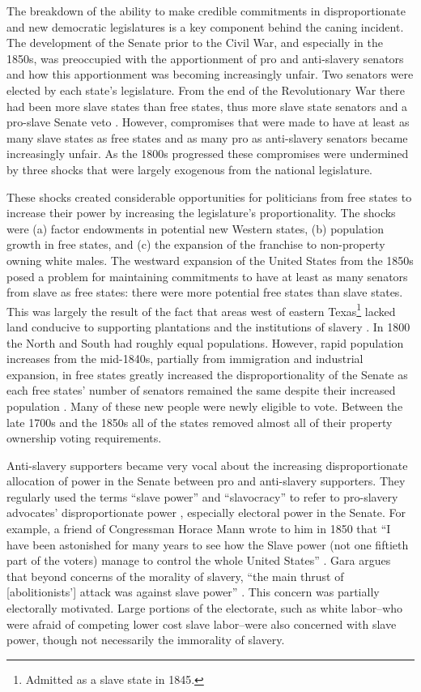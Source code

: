 \documentclass[a4paper]{article}\usepackage[]{graphicx}\usepackage[]{color}
\begin{document}
The breakdown of the ability to make credible commitments in disproportionate and new democratic legislatures is a key component behind the caning incident. The development of the Senate prior to the Civil War, and especially in the 1850s, was preoccupied with the apportionment of pro and anti-slavery senators and how this apportionment was becoming increasingly unfair. Two senators were elected by each state's legislature. From the end of the Revolutionary War there had been more slave states than free states, thus more slave state senators and a pro-slave Senate veto \cite[151]{Weingast1998}. However, compromises that were made to have at least as many slave states as free states and as many pro as anti-slavery senators became increasingly unfair. As the 1800s progressed these compromises were undermined by three shocks that were largely exogenous from the national legislature.

These shocks created considerable opportunities for politicians from free states to increase their power by increasing the legislature's proportionality. The shocks were (a) factor endowments in potential new Western states, (b) population growth in free states, and (c) the expansion of the franchise to non-property owning white males. The westward expansion of the United States from the 1850s posed a problem for maintaining commitments to have at least as many senators from slave as free states: there were more potential free states than slave states. This was largely the result of the fact that areas west of eastern Texas\footnote{Admitted as a slave state in 1845.} lacked land conducive to supporting plantations and the institutions of slavery \cite[]{Ramsdell1929,Weingast1998}. In 1800 the North and South had roughly equal populations. However, rapid population increases from the mid-1840s, partially from immigration and industrial expansion, in free states greatly increased the disproportionality of the Senate as each free states' number of senators remained the same despite their increased population \cite[184]{Weingast1998}. Many of these new people were newly eligible to vote. Between the late 1700s and the 1850s all of the states removed almost all of their property ownership voting requirements.

Anti-slavery supporters became very vocal about the increasing disproportionate allocation of power in the Senate between pro and anti-slavery supporters. They regularly used the terms ``slave power'' and ``slavocracy'' to refer to pro-slavery advocates' disproportionate power \citep{richards2000}, especially electoral power in the Senate. For example, a friend of Congressman Horace Mann wrote to him in 1850 that ``I have been astonished for many years to see how the Slave power (not one fiftieth part of the voters) manage to control the whole United States'' \citep[quoted in][6]{Gara1969}. Gara argues that beyond concerns of the morality of slavery, ``the main thrust of [abolitionists'] attack was against slave power'' \citeyearpar[6]{Gara1969}. This concern was partially electorally motivated. Large portions of the electorate, such as white labor--who were afraid of competing lower cost slave labor--were also concerned with slave power, though not necessarily the immorality of slavery.
\end{document}
